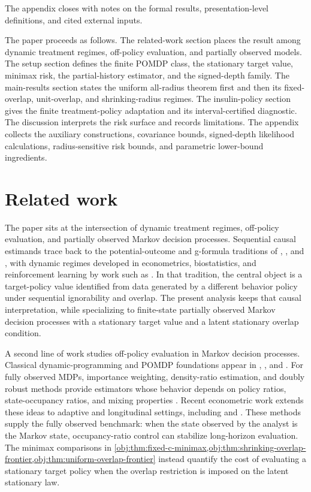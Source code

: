\documentclass[11pt]{article}
\begin{document}
The appendix closes with notes on the formal results, presentation-level definitions, and cited external inputs.

The paper proceeds as follows. The related-work section places the result among dynamic treatment regimes, off-policy evaluation, and partially observed models. The setup section defines the finite POMDP class, the stationary target value, minimax risk, the partial-history estimator, and the signed-depth family. The main-results section states the uniform all-radius theorem first and then its fixed-overlap, unit-overlap, and shrinking-radius regimes. The insulin-policy section gives the finite treatment-policy adaptation and its interval-certified diagnostic. The discussion interprets the risk surface and records limitations. The appendix collects the auxiliary constructions, covariance bounds, signed-depth likelihood calculations, radius-sensitive risk bounds, and parametric lower-bound ingredients.


\section{Related work}

The paper sits at the intersection of dynamic treatment regimes, off-policy evaluation, and partially observed Markov decision processes. Sequential causal estimands trace back to the potential-outcome and g-formula traditions of \citet{Robins1986}, \citet{Rosenbaum1983}, and \citet{Robins2000}, with dynamic regimes developed in econometrics, biostatistics, and reinforcement learning by work such as \citet{Murphy2003}. In that tradition, the central object is a target-policy value identified from data generated by a different behavior policy under sequential ignorability and overlap. The present analysis keeps that causal interpretation, while specializing to finite-state partially observed Markov decision processes with a stationary target value and a latent stationary overlap condition.

A second line of work studies off-policy evaluation in Markov decision processes. Classical dynamic-programming and POMDP foundations appear in \citet{Smallwood1973}, \citet{Kaelbling1998}, and \citet{Sutton2018}. For fully observed MDPs, importance weighting, density-ratio estimation, and doubly robust methods provide estimators whose behavior depends on policy ratios, state-occupancy ratios, and mixing properties \citep{Precup2000,Jiang2016,Thomas2016,Liu2018,Nachum2019,Uehara2020,KallusUehara2020}. Recent econometric work extends these ideas to adaptive and longitudinal settings, including \citet{LiaoKlasnjaMurphy2021} and \citet{Liao2022}. These methods supply the fully observed benchmark: when the state observed by the analyst is the Markov state, occupancy-ratio control can stabilize long-horizon evaluation. The minimax comparisons in \cref{obj:thm:fixed-c-minimax,obj:thm:shrinking-overlap-frontier,obj:thm:uniform-overlap-frontier} instead quantify the cost of evaluating a stationary target policy when the overlap restriction is imposed on the latent stationary law.
\end{document}
